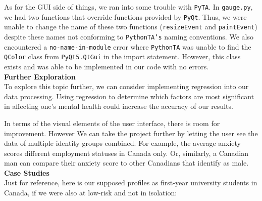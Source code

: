 \documentclass[fontsize=11pt]{article}
\begin{document}
	As for the GUI side of things, we ran into some trouble with \texttt{PyTA}. In \texttt{gauge.py}, we had two functions that override functions provided by \texttt{PyQt}. Thus, we were unable to change the name of these two functions (\texttt{resizeEvent} and \texttt{paintEvent}) despite these names not conforming to \texttt{PythonTA’s} naming conventions. We also encountered a \texttt{no-name-in-module} error where \texttt{PythonTA} was unable to find the \texttt{QColor} class from \texttt{PyQt5.QtGui} in the import statement. However, this class exists and was able to be implemented in our code with no errors. \\

	\textbf{Further Exploration} \\
	To explore this topic further, we can consider implementing regression into our data processing.  Using regression to determine which factors are most significant in affecting one’s mental health could increase the accuracy of our results.

	In terms of the visual elements of the user interface, there is room for improvement. However
	We can take the project further by letting the user see the data of multiple identity groups combined. For example, the average anxiety scores different employment statuses in Canada only. Or, similarly, a Canadian man can compare their anxiety score to other Canadians that identify as male. \\

	\textbf{Case Studies} \\
	Just for reference, here is our supposed profiles as first-year university students in Canada, if we were also at low-risk and not in isolation:
\end{document}
